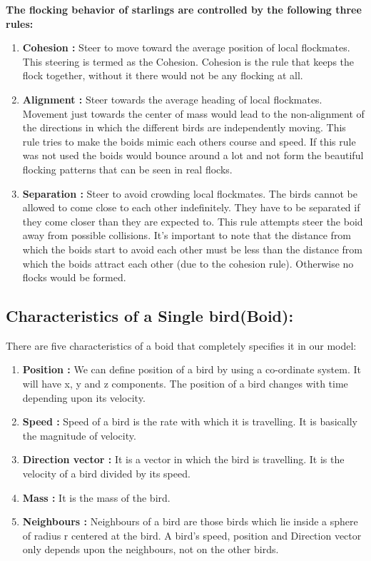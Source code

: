 \documentclass[12pt]{article}
\begin{document}
\textbf{The flocking behavior of starlings are controlled by the following three rules:}
\begin{enumerate}

\item {\textbf{Cohesion :}} Steer to move toward the average position of local flockmates. This steering is termed as the Cohesion. Cohesion is the
rule that keeps the flock together, without it there would not be any flocking at all.
\item {\textbf{Alignment :}} Steer towards the average heading of local flockmates. Movement just towards the center of mass would lead to the non-alignment of the directions in which the different birds are independently moving. This rule tries to make the boids mimic each others course and speed. If this rule was not used the boids would bounce around a lot and not form the beautiful flocking patterns that can
be seen in real flocks.
\item {\textbf{Separation :}} Steer to avoid crowding local flockmates. The birds cannot be allowed to come close to each other indefinitely. They have to be separated if they come closer than they are expected to. This rule attempts steer the
boid away from possible collisions. It’s important to note that the distance from
which the boids start to avoid each other must be less than the distance from which
the boids attract each other (due to the cohesion rule). Otherwise no flocks would
be formed.

\end{enumerate}

\subsection{Characteristics of a Single bird(Boid):}

There are five characteristics of a boid that completely specifies it in our model:
\begin{enumerate}
\item{\textbf{Position :}} We can define position of a bird by using a co-ordinate system. It will have x, y and z components. The position of a bird changes with time depending upon its velocity.
\item{\textbf{Speed :}} Speed of a bird is the rate with which it is travelling. It is basically the magnitude of velocity.
\item{\textbf{Direction vector :}} It is a vector in which the bird is travelling. It is the velocity of a bird divided by its speed.
\item{\textbf{Mass :}} It is the mass of the bird.
\item{\textbf{Neighbours :}} Neighbours of a bird are those birds which lie inside a sphere of radius r centered at the bird. A bird's speed, position and Direction vector only depends upon the neighbours, not on the other birds.
\end{enumerate}
\end{document}
